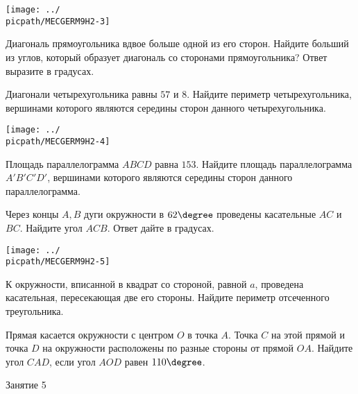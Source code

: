 \begin{homework}[number=2]
\begin{listofex}
		\hspace{0.02\linewidth}
		\begin{minipage}[t]{\picwidth}
			\texttt{[image: ../\\picpath/MECGERM9H2-3]}
		\end{minipage}
		\item Диагональ прямоугольника вдвое больше одной из его сторон. Найдите больший из углов, который образует диагональ со сторонами прямоугольника? Ответ выразите в градусах.
		\item
		\begin{minipage}[t]{\bodywidth}
			Диагонали четырехугольника равны \(57\) и \(8\). Найдите периметр четырехугольника, вершинами которого являются середины сторон данного четырехугольника.
		\end{minipage}
		\hspace{0.02\linewidth}
		\begin{minipage}[t]{\picwidth}
			\texttt{[image: ../\\picpath/MECGERM9H2-4]}
		\end{minipage}
		\item Площадь параллелограмма \(ABCD\) равна \(153\). Найдите площадь параллелограмма \(A'B'C'D'\), вершинами которого являются середины сторон данного параллелограмма.
		\item
		\begin{minipage}[t]{\bodywidth}
			Через концы \(A, B\) дуги окружности в \(62\degree \) проведены касательные \(AC\) и \(BC\). Найдите угол \(ACB\). Ответ дайте в градусах.
		\end{minipage}
		\hspace{0.02\linewidth}
		\begin{minipage}[t]{\picwidth}
			\texttt{[image: ../\\picpath/MECGERM9H2-5]}
		\end{minipage}
		\item К окружности, вписанной в квадрат со стороной, равной \(a\), проведена касательная, пересекающая две его стороны. Найдите периметр отсеченного треугольника.
		\item Прямая касается окружности с центром \(O\) в точка \(A\). Точка \(C\) на этой прямой и точка \(D\) на окружности расположены по разные стороны от прямой \(OA\). Найдите угол \(CAD\), если угол \(AOD\) равен \(110 \degree\).
	\end{listofex}
\end{homework}

\begin{class}[number=5]
	\begin{listofex}
		\item Занятие 5
	\end{listofex}
\end{class}

